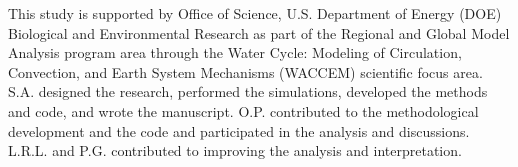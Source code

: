 \documentclass[
    aps,
    prl,
    reprint,
    superscriptaddress,
    amsmath,amssymb,
    floatfix,
    nofootinbib
]{revtex4-2}
\begin{document}
This study is supported by Office of Science, U.S. Department of Energy (DOE) Biological and Environmental Research as part of the Regional and Global Model Analysis program area through the Water Cycle: Modeling of Circulation, Convection, and Earth System Mechanisms (WACCEM) scientific focus area. S.A. designed the research, performed the simulations, developed the methods and code, and wrote the manuscript. O.P. contributed to the methodological development and the code and participated in the analysis and discussions. L.R.L. and P.G. contributed to improving the analysis and interpretation.



\end{document}
